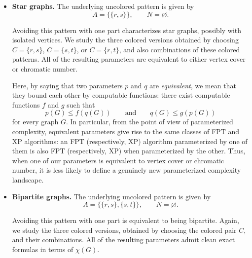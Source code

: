 \documentclass[11pt]{article}
\theoremstyle{definition}
\theoremstyle{plain}
\theoremstyle{remark}
\begin{document}
\begin{itemize}
\item \textbf{Star graphs.}
The underlying uncolored pattern is given by
\[
A=\bigl\{\{r,s\}\bigr\},
\qquad
N=\varnothing.
\]
\begin{center}
\end{center}
Avoiding this pattern with one part characterizes star graphs, possibly with isolated vertices.
We study the three colored versions obtained by choosing \(C=\{r,s\}\), \(C=\{s,t\}\), or \(C=\{r,t\}\),
and also combinations of these colored patterns. All of the resulting parameters are equivalent to either vertex cover
or chromatic number.

Here, by saying that two parameters \(p\) and \(q\) are \emph{equivalent}, we mean that they bound each other
by computable functions: there exist computable functions \(f\) and \(g\) such that
\[
p(G)\le f(q(G))
\qquad\text{and}\qquad
q(G)\le g(p(G))
\]
for every graph \(G\). In particular, from the point of view of parameterized complexity, equivalent parameters
give rise to the same classes of FPT and XP algorithms: an FPT (respectively, XP) algorithm parameterized by one of them
is also FPT (respectively, XP) when parameterized by the other. Thus, when one of our parameters is equivalent to
vertex cover or chromatic number, it is less likely to define a genuinely new parameterized complexity landscape.

\item \textbf{Bipartite graphs.}
The underlying uncolored pattern is given by
\[
A=\bigl\{\{r,s\},\{s,t\}\bigr\},
\qquad
N=\varnothing.
\]
\begin{center}
\end{center}
Avoiding this pattern with one part is equivalent to being bipartite.
Again, we study the three colored versions, obtained by choosing the colored pair \(C\), and their combinations.
All of the resulting parameters admit clean exact formulas in terms of \(\chi(G)\).


\end{itemize}
\end{document}
